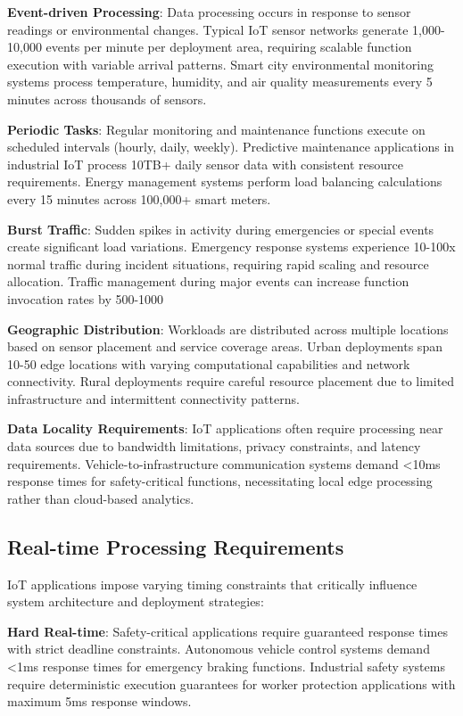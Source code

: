 \textbf{Event-driven Processing}: Data processing occurs in response to sensor readings or environmental changes. Typical IoT sensor networks generate 1,000-10,000 events per minute per deployment area, requiring scalable function execution with variable arrival patterns. Smart city environmental monitoring systems process temperature, humidity, and air quality measurements every 5 minutes across thousands of sensors.

\textbf{Periodic Tasks}: Regular monitoring and maintenance functions execute on scheduled intervals (hourly, daily, weekly). Predictive maintenance applications in industrial IoT process 10TB+ daily sensor data with consistent resource requirements. Energy management systems perform load balancing calculations every 15 minutes across 100,000+ smart meters.

\textbf{Burst Traffic}: Sudden spikes in activity during emergencies or special events create significant load variations. Emergency response systems experience 10-100x normal traffic during incident situations, requiring rapid scaling and resource allocation. Traffic management during major events can increase function invocation rates by 500-1000%

\textbf{Geographic Distribution}: Workloads are distributed across multiple locations based on sensor placement and service coverage areas. Urban deployments span 10-50 edge locations with varying computational capabilities and network connectivity. Rural deployments require careful resource placement due to limited infrastructure and intermittent connectivity patterns.

\textbf{Data Locality Requirements}: IoT applications often require processing near data sources due to bandwidth limitations, privacy constraints, and latency requirements. Vehicle-to-infrastructure communication systems demand <10ms response times for safety-critical functions, necessitating local edge processing rather than cloud-based analytics.

\subsection{Real-time Processing Requirements}

IoT applications impose varying timing constraints that critically influence system architecture and deployment strategies:

\textbf{Hard Real-time}: Safety-critical applications require guaranteed response times with strict deadline constraints. Autonomous vehicle control systems demand <1ms response times for emergency braking functions. Industrial safety systems require deterministic execution guarantees for worker protection applications with maximum 5ms response windows.

